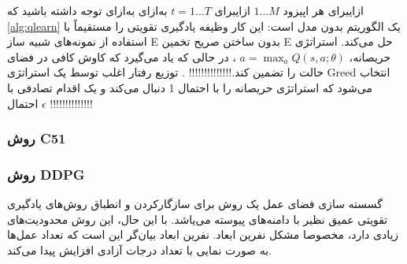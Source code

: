 ‌ازای{برای هر اپیزود 
$1...M$}
‌ازای{برای $t=1...T$}
  ‌به‌ازای
‌به‌ازای
\label{alg:qlearn}
توجه داشته باشید که \ref{alg:qlearn} یک الگوریتم بدون مدل است: این کار وظیفه یادگیری تقویتی را مستقیماً با استفاده از نمونه‌های شبیه ساز E بدون ساختن صریح تخمین E حل می‌کند.
 استراتژی حریصانه،
 $a = \max_{a} Q(s, a; \theta)$
 ، در حالی که یاد می‌گیرد که
کاوش کافی در فضای حالت را تضمین کند.!!!!!!!!!!!!!! . توزیع رفتار اغلب توسط یک استراتژی Greed انتخاب می‌شود که استراتژی حریصانه را با احتمال 1 دنبال می‌کند و یک
اقدام تصادفی با احتمال $\epsilon$
!!!!!!!!!!!!!!
\subsubsection{روش C51 }
\subsubsection{روش DDPG}

گسسته سازی فضای عمل یک روش برای سازگار‌کردن و انطباق روش‌های یادگیری تقویتی عمیق نظیر 
با دامنه‌های پیوسته می‌یاشد. با این حال، این روش محدودیت‌های زیادی دارد، مخصوصا مشکل نفرین ابعاد.  نفرین ابعاد بیان‌گر این است که تعداد عمل‌ها به صورت نمایی با تعداد درجات آزادی افزایش پیدا می‌کند. 

